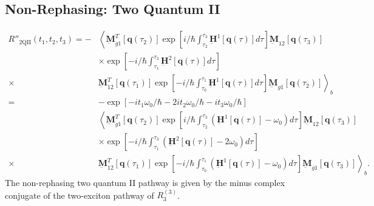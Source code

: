 \documentclass{article}
\newcommand{\bra}[1]{\ensuremath{\left\langle#1\right|}}
\newcommand{\ket}[1]{\ensuremath{\left|#1\right\rangle}}
\newcommand{\vect}[1]{\ensuremath{\boldsymbol{\mathbf{#1}}}}
\newcommand{\arw}{-{Latex[length=2mm]}}
\begin{document}
\clearpage
\subsection{Non-Rephasing: Two Quantum II}
\begin{figure}[h]
\centering
{}
\end{figure}
\begin{equation}
\begin{split}
 R''_\mathrm{2QII}(t_{1},t_{2},t_{3})=-
 &\left\langle\underbar{\vect{M}}_{g1}^{T}[\vect q(\tau_{2})]\exp\left[i/\hbar\int_{\tau_{2}}^{\tau_{3}}\underbar{\vect{H}}^{1}[\vect q(\tau)]d\tau\right] \underbar{\vect{M}}_{12} [\vect q(\tau_{3})]\right.\\
 &\times\exp\left[-i/\hbar\int_{\tau_{1}}^{\tau_{3}}\underbar{\vect{H}}^{2}[\vect q(\tau)]d\tau\right]\\
 \times&\left.\underbar{\vect{M}}_{12}^{T}[\vect q(\tau_{1})]\exp\left[-i/\hbar\int_{\tau_{0}}^{\tau_{1}}\underbar{\vect{H}}^{1}[\vect q(\tau)]d\tau\right] \underbar{\vect{M}}_{g1} [\vect q(\tau_{2})]\right\rangle_{b}\\
 =&-\exp\left[-i t_{1}\omega_{0}/\hbar-2it_{2}\omega_{0}/\hbar-it_{3}\omega_{0}/\hbar\right]\\
 &\left\langle\underbar{\vect{M}}_{g1}^{T}[\vect q(\tau_{2})]\exp\left[i/\hbar\int_{\tau_{2}}^{\tau_{3}}\left(\underbar{\vect{H}}^{1}[\vect q(\tau)]-\omega_{0}\right)d\tau\right] \underbar{\vect{M}}_{12} [\vect q(\tau_{3})]\right.\\
 &\times\exp\left[-i/\hbar\int_{\tau_{1}}^{\tau_{3}}\left(\underbar{\vect{H}}^{2}[\vect q(\tau)]-2\omega_{0}\right)d\tau\right]\\
 \times&\left.\underbar{\vect{M}}_{12}^{T}[\vect q(\tau_{1})]\exp\left[-i/\hbar\int_{\tau_{0}}^{\tau_{1}}\left(\underbar{\vect{H}}^{1}[\vect q(\tau)]-\omega_{0}\right)d\tau\right] \underbar{\vect{M}}_{g1} [\vect q(\tau_{3})]\right\rangle_{b}.
\end{split}
\end{equation}
The non-rephasing two quantum II pathway is given by the minus complex conjugate of the two-exciton pathway of $R_{3}^{(3)}$.\cite{Hamm2011}
\clearpage


\end{document}
